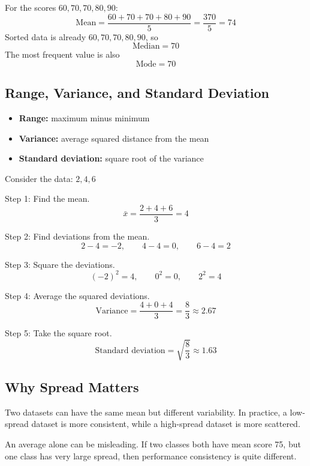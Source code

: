 \documentclass[11pt,a4paper]{article}
\begin{document}
\begin{examplebox}
For the scores $60, 70, 70, 80, 90$:
\[
\text{Mean} = \frac{60 + 70 + 70 + 80 + 90}{5} = \frac{370}{5} = 74
\]
Sorted data is already $60, 70, 70, 80, 90$, so
\[
\text{Median} = 70
\]
The most frequent value is also
\[
\text{Mode} = 70
\]
\end{examplebox}

\subsection{Range, Variance, and Standard Deviation}

\begin{itemize}[leftmargin=*]
  \item \textbf{Range:} maximum minus minimum
  \item \textbf{Variance:} average squared distance from the mean
  \item \textbf{Standard deviation:} square root of the variance
\end{itemize}

\begin{examplebox}
Consider the data: $2, 4, 6$

Step 1: Find the mean.
\[
\bar{x} = \frac{2 + 4 + 6}{3} = 4
\]

Step 2: Find deviations from the mean.
\[
2 - 4 = -2, \qquad 4 - 4 = 0, \qquad 6 - 4 = 2
\]

Step 3: Square the deviations.
\[
(-2)^2 = 4, \qquad 0^2 = 0, \qquad 2^2 = 4
\]

Step 4: Average the squared deviations.
\[
\text{Variance} = \frac{4 + 0 + 4}{3} = \frac{8}{3} \approx 2.67
\]

Step 5: Take the square root.
\[
\text{Standard deviation} = \sqrt{\frac{8}{3}} \approx 1.63
\]
\end{examplebox}

\subsection{Why Spread Matters}

Two datasets can have the same mean but different variability. In practice, a low-spread dataset is more consistent, while a high-spread dataset is more scattered.

\begin{alertbox}
An average alone can be misleading. If two classes both have mean score 75, but one class has very large spread, then performance consistency is quite different.
\end{alertbox}
\end{document}
